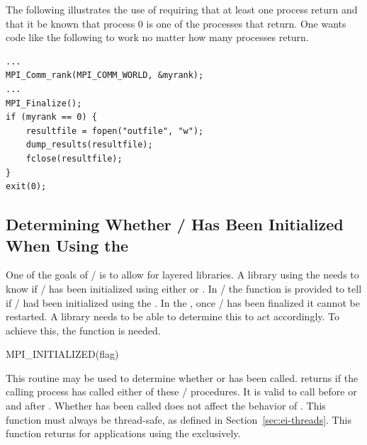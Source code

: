 \begin{example}\label{example:finalize-rank0}
%
The following illustrates the use of requiring that at least one
process return and that it be known that process 0 is one of the processes
that return.  One wants code like the following to work no matter how many
processes return.

\begin{lstlisting}[language={[MPI]C}]
...
MPI_Comm_rank(MPI_COMM_WORLD, &myrank);
...
MPI_Finalize();
if (myrank == 0) {
    resultfile = fopen("outfile", "w");
    dump_results(resultfile);
    fclose(resultfile);
}
exit(0);
\end{lstlisting}
\end{example}

\subsection{Determining Whether \texorpdfstring{\mpi/}{MPI} Has Been Initialized When Using the \texorpdfstring{\wpm}{World Model}}

One of the goals of \mpi/ is to allow for layered libraries.  A library
using the \wpm{} needs to know if \mpi/ has been initialized using either  or .
In \mpi/ the function  is
provided to tell if \mpi/ had been initialized using the \wpm{}.
In the \wpm{}, once \mpi/ has been finalized it
cannot be restarted.  A library needs to be
able to determine this to act accordingly.  To achieve this, the
function  is needed.

\begin{funcdef}{MPI\_INITIALIZED}{(\mbox{flag})}
\end{funcdef}

This routine may be used to determine whether  or  has been
called.
 returns  if the calling process has
called either of these \MPI/ procedures. It is valid to call 
before  or  and after .
Whether  has been
called does not affect the behavior of .
This function must always be thread-safe, as defined in
Section~\ref{sec:ei-threads}.  This function returns  for
applications using the \spm{} exclusively.

